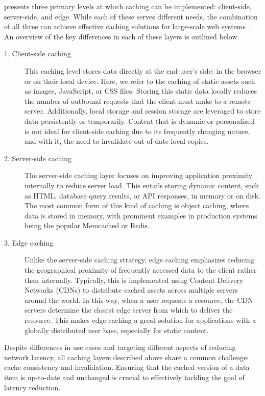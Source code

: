 

\citeauthor{latency-caching} presents three primary levels at which caching can be implemented: client-side, server-side, and edge. While each of these serves different needs, the combination of all three can achieve effective caching solutions for large-scale web systems \cite{latency-caching}. An overview of the key differences in each of these layers is outlined below.

\begin{description}
    \item[1. Client-side caching] This caching level stores data directly at the end-user's side: in the browser or on their local device. Here, we refer to the caching of static assets such as images, JavaScript, or CSS files. Storing this static data locally reduces the number of outbound requests that the client must make to a remote server. Additionally, local storage and session storage are leveraged to store data persistently or temporarily. Content that is dynamic or personalized is not ideal for client-side caching due to its frequently changing nature, and with it, the need to invalidate out-of-date local copies.
    \item[2. Server-side caching] The server-side caching layer focuses on improving application proximity internally to reduce server load. This entails storing dynamic content, such as HTML, database query results, or API responses, in memory or on disk. The most common form of this kind of caching is object caching, where data is stored in memory, with prominent examples in production systems being the popular Memcached or Redis. 
    \item[3. Edge caching] Unlike the server-side caching strategy, edge caching emphasizes reducing the geographical proximity of frequently accessed data to the client rather than internally. Typically, this is implemented using Content Delivery Networks (CDNs) to distribute cached assets across multiple servers around the world. In this way, when a user requests a resource, the CDN servers determine the closest edge server from which to deliver the resource. This makes edge caching a great solution for applications with a globally distributed user base, especially for static content.
\end{description}

Despite differences in use cases and targeting different aspects of reducing network latency, all caching layers described above share a common challenge: cache consistency and invalidation. Ensuring that the cached version of a data item is up-to-date and unchanged is crucial to effectively tackling the goal of latency reduction.

